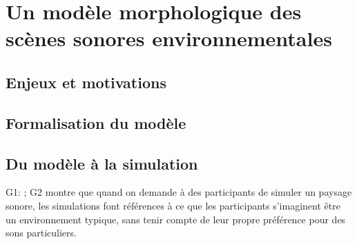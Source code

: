 \chapter{Un modèle morphologique des scènes sonores environnementales}\label{ch:psycho_model} %

\section{Enjeux et motivations}

\section{Formalisation du modèle}

\section{Du modèle à la simulation}

G1: \citep{bruce2009development,bruce2014effects}; G2 \citep{davies2014soundscape} montre que quand on demande à des participants de simuler un paysage sonore, les simulations font références à ce que les participants s'imaginent être un environnement typique, sans tenir compte de leur propre préférence pour des sons particuliers.



